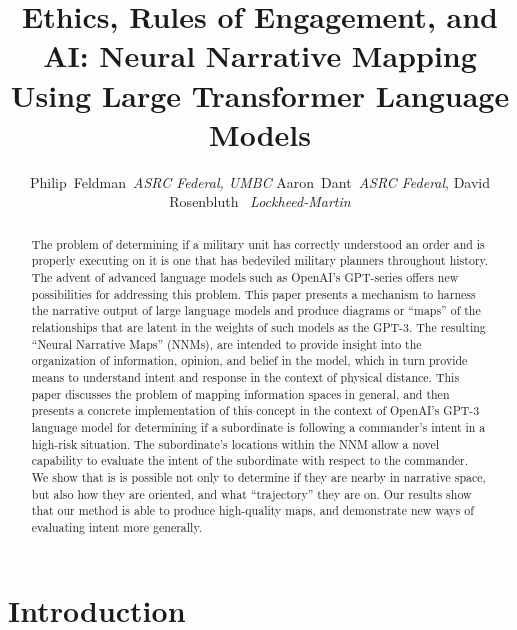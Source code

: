 \documentclass[11pt,dvipdfm]{article}
\begin{document}
\title{Ethics, Rules of Engagement, and AI: Neural Narrative Mapping Using Large Transformer Language Models}
\author{Philip~Feldman~\textit{ASRC Federal, UMBC}
        Aaron~Dant~\textit{ASRC Federal}, David Rosenbluth ~\textit{Lockheed-Martin}}%


\maketitle
\begin{abstract}
The problem of determining if a military unit has correctly understood an order and is properly executing on it is one that has bedeviled military planners throughout history. The advent of advanced language models such as OpenAI's GPT-series offers new possibilities for addressing this problem. This paper presents a mechanism to harness the narrative output of large language models and produce diagrams or \enquote{maps} of the relationships that are latent in the weights of such models as the GPT-3. The resulting \enquote{Neural Narrative Maps} (NNMs), are intended to provide insight into the organization of information, opinion, and belief in the model, which in turn  provide means to understand intent and response in the context of physical distance. This paper discusses the problem of mapping information spaces in general, and then presents a concrete implementation of this concept in the context of OpenAI's GPT-3 language model for determining if a subordinate is following a commander's intent in a high-risk situation. The subordinate's locations within the NNM allow a novel capability to evaluate the intent of the subordinate with respect to the commander. We show that is is possible not only to determine if they are nearby in narrative space, but also how they are oriented, and what \enquote{trajectory} they are on. Our results show that our method is able to produce high-quality maps, and demonstrate new ways of evaluating intent more generally.
\end{abstract}

\section{Introduction}
\label{sec:introduction}

\end{document}
